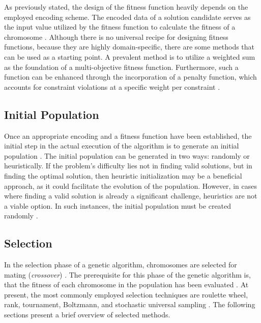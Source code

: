 \documentclass[sigconf]{acmart}
\begin{document}
As previously stated, the design of the fitness function heavily depends on the
employed encoding scheme. The encoded data of a solution candidate serves as
the input value utilized by the fitness function to calculate the fitness of a
chromosome \cite{Affenzeller2009}. Although there is no universal recipe for
designing fitness functions, because they are highly domain-specific,
there are some methods that can be used as a starting point.
A prevalent method is to utilize a weighted sum as the foundation of a
multi-objective fitness function. Furthermore, such a function can be enhanced
through the incorporation of a penalty function, which accounts for constraint
violations at a specific weight per constraint \cite{Beligiannis2009}.



\subsection{Initial Population}
Once an appropriate encoding and a fitness function have been established,
the initial step in the actual execution of the algorithm is to generate an
initial population \cite{Affenzeller2009}.
The initial population can be generated in two ways: randomly or heuristically.
If the problem's difficulty lies not in finding valid solutions, but in finding
the optimal solution, then heuristic initialization may be a beneficial
approach, as it could facilitate the evolution of the population.
However, in cases where finding a valid solution is already a significant
challenge, heuristics are not a viable option. In such instances, the initial
population must be created randomly \cite{Affenzeller2009}.

\subsection{Selection}
In the selection phase of a genetic algorithm, chromosomes are selected for
mating (\textit{crossover}) \cite{Affenzeller2009}.
The prerequisite for this phase of the genetic algorithm is, that the
fitness of each chromosome in the population has been evaluated
\cite{Affenzeller2009}.
At present, the most commonly employed selection techniques are roulette wheel,
rank, tournament, Boltzmann, and stochastic universal sampling
\cite{Katoch2021}.
The following sections present a brief overview of selected methods.
\end{document}

